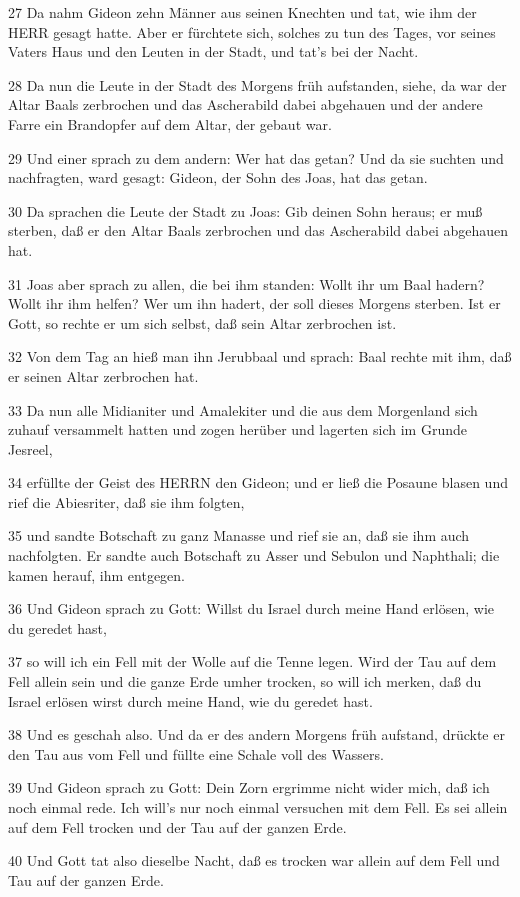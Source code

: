 \par 27 Da nahm Gideon zehn Männer aus seinen Knechten und tat, wie ihm der HERR gesagt hatte. Aber er fürchtete sich, solches zu tun des Tages, vor seines Vaters Haus und den Leuten in der Stadt, und tat's bei der Nacht.
\par 28 Da nun die Leute in der Stadt des Morgens früh aufstanden, siehe, da war der Altar Baals zerbrochen und das Ascherabild dabei abgehauen und der andere Farre ein Brandopfer auf dem Altar, der gebaut war.
\par 29 Und einer sprach zu dem andern: Wer hat das getan? Und da sie suchten und nachfragten, ward gesagt: Gideon, der Sohn des Joas, hat das getan.
\par 30 Da sprachen die Leute der Stadt zu Joas: Gib deinen Sohn heraus; er muß sterben, daß er den Altar Baals zerbrochen und das Ascherabild dabei abgehauen hat.
\par 31 Joas aber sprach zu allen, die bei ihm standen: Wollt ihr um Baal hadern? Wollt ihr ihm helfen? Wer um ihn hadert, der soll dieses Morgens sterben. Ist er Gott, so rechte er um sich selbst, daß sein Altar zerbrochen ist.
\par 32 Von dem Tag an hieß man ihn Jerubbaal und sprach: Baal rechte mit ihm, daß er seinen Altar zerbrochen hat.
\par 33 Da nun alle Midianiter und Amalekiter und die aus dem Morgenland sich zuhauf versammelt hatten und zogen herüber und lagerten sich im Grunde Jesreel,
\par 34 erfüllte der Geist des HERRN den Gideon; und er ließ die Posaune blasen und rief die Abiesriter, daß sie ihm folgten,
\par 35 und sandte Botschaft zu ganz Manasse und rief sie an, daß sie ihm auch nachfolgten. Er sandte auch Botschaft zu Asser und Sebulon und Naphthali; die kamen herauf, ihm entgegen.
\par 36 Und Gideon sprach zu Gott: Willst du Israel durch meine Hand erlösen, wie du geredet hast,
\par 37 so will ich ein Fell mit der Wolle auf die Tenne legen. Wird der Tau auf dem Fell allein sein und die ganze Erde umher trocken, so will ich merken, daß du Israel erlösen wirst durch meine Hand, wie du geredet hast.
\par 38 Und es geschah also. Und da er des andern Morgens früh aufstand, drückte er den Tau aus vom Fell und füllte eine Schale voll des Wassers.
\par 39 Und Gideon sprach zu Gott: Dein Zorn ergrimme nicht wider mich, daß ich noch einmal rede. Ich will's nur noch einmal versuchen mit dem Fell. Es sei allein auf dem Fell trocken und der Tau auf der ganzen Erde.
\par 40 Und Gott tat also dieselbe Nacht, daß es trocken war allein auf dem Fell und Tau auf der ganzen Erde.

